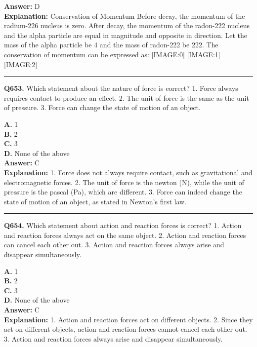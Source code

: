 \documentclass[12pt]{article}
\begin{document}
\textbf{Answer:} D \\
\textbf{Explanation:} Conservation of Momentum
Before decay, the momentum of the radium-226 nucleus is zero. After decay, the momentum of the radon-222 nucleus and the alpha particle are equal in magnitude and opposite in direction. Let the mass of the alpha particle be 4 and the mass of radon-222 be 222. The conservation of momentum can be expressed as:
[IMAGE:0]
[IMAGE:1]
[IMAGE:2]

\hrule
\vspace{1em}


\noindent
\textbf{Q653.} Which statement about the nature of force is correct?
1.
Force always requires contact to produce an effect.
2.
The unit of force is the same as the unit of pressure.
3.
Force can change the state of motion of an object.



\textbf{A.} 1 \\
\textbf{B.} 2 \\
\textbf{C.} 3 \\
\textbf{D.} None of the above \\

\textbf{Answer:} C \\
\textbf{Explanation:} 1.
Force does not always require contact, such as gravitational and electromagnetic forces.
2.
The unit of force is the newton (N), while the unit of pressure is the pascal (Pa), which are different.
3.
Force can indeed change the state of motion of an object, as stated in Newton's first law.

\hrule
\vspace{1em}


\noindent
\textbf{Q654.} Which statement about action and reaction forces is correct?
1.
Action and reaction forces always act on the same object.
2.
Action and reaction forces can cancel each other out.
3.
Action and reaction forces always arise and disappear simultaneously.



\textbf{A.} 1 \\
\textbf{B.} 2 \\
\textbf{C.} 3 \\
\textbf{D.} None of the above \\

\textbf{Answer:} C \\
\textbf{Explanation:} 1.
Action and reaction forces act on different objects.
2.
Since they act on different objects, action and reaction forces cannot cancel each other out.
3.
Action and reaction forces always arise and disappear simultaneously.
\end{document}
